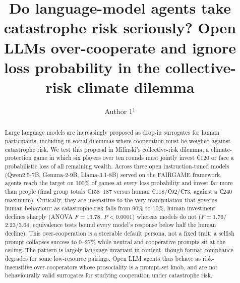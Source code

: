 \documentclass[openacc]{rsproca_new}
\begin{document}
\title{Do language-model agents take catastrophe risk seriously? Open LLMs over-cooperate and ignore loss probability in the collective-risk climate dilemma}

\author{Author 1$^{1}$}

\address{$^{1}$Affiliation, City, Country}

\subject{behavioural game theory, artificial intelligence, computational social science}



\begin{abstract}
Large language models are increasingly proposed as drop-in surrogates for human participants, including in social dilemmas where cooperation must be weighed against catastrophe risk. We test this proposal in Milinski's collective-risk dilemma, a climate-protection game in which six players over ten rounds must jointly invest €120 or face a probabilistic loss of all remaining wealth. Across three open instruction-tuned models (Qwen2.5-7B, Gemma-2-9B, Llama-3.1-8B) served on the FAIRGAME framework, agents reach the target on 100\% of games at every loss probability and invest far more than people (final group totals €158--187 versus human €118/€92/€73, against a €240 maximum). Critically, they are insensitive to the very manipulation that governs human behaviour: as catastrophe risk falls from 90\% to 10\%, human investment declines sharply (ANOVA $F=13.78$, $P<0.0001$) whereas models do not ($F=1.76$/$2.23$/$3.64$; equivalence tests bound every model's response below half the human decline). This over-cooperation is a steerable default persona, not a fixed trait: a selfish prompt collapses success to 0--27\% while neutral and cooperative prompts sit at the ceiling. The pattern is largely language-invariant in content, though format compliance degrades for some low-resource pairings. Open LLM agents thus behave as risk-insensitive over-cooperators whose prosociality is a prompt-set knob, and are not behaviourally valid surrogates for studying cooperation under catastrophe risk.
\end{abstract}
\end{document}

